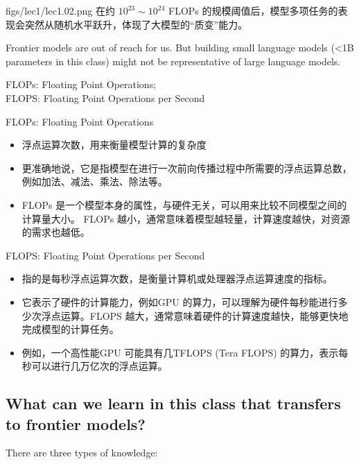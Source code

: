 \MarginImageWithNote
  {figs/lec1/lec1.02.png}
  {}
  {%
    在约 $10^{23}\sim10^{24}$ FLOPs 的规模阈值后，模型多项任务的表现会突然从随机水平跃升，体现了大模型的“质变”能力。%
  }

Frontier models are out of reach for us. But building small language models (<1B parameters in this class) might not be representative of large language models.



{FLOPs: Floating Point Operations; \\
FLOPS: Floating Point Operations per Second}

FLOPs: Floating Point Operations
\begin{itemize}
    \item 浮点运算次数，用来衡量模型计算的复杂度
    \item 更准确地说，它是指模型在进行一次前向传播过程中所需要的浮点运算总数，例如加法、减法、乘法、除法等。
    \item FLOPs 是一个模型本身的属性，与硬件无关，可以用来比较不同模型之间的计算量大小。 FLOPs 越小，通常意味着模型越轻量，计算速度越快，对资源的需求也越低。
\end{itemize}

FLOPS: Floating Point Operations per Second
\begin{itemize}
    \item 指的是每秒浮点运算次数，是衡量计算机或处理器浮点运算速度的指标。
    \item 它表示了硬件的计算能力，例如GPU 的算力，可以理解为硬件每秒能进行多少次浮点运算。FLOPS 越大，通常意味着硬件的计算速度越快，能够更快地完成模型的计算任务。
    \item 例如，一个高性能GPU 可能具有几TFLOPS (Tera FLOPS) 的算力，表示每秒可以进行几万亿次的浮点运算。
\end{itemize}

\subsection{What can we learn in this class that transfers to frontier models?
}
There are three types of knowledge:
    
